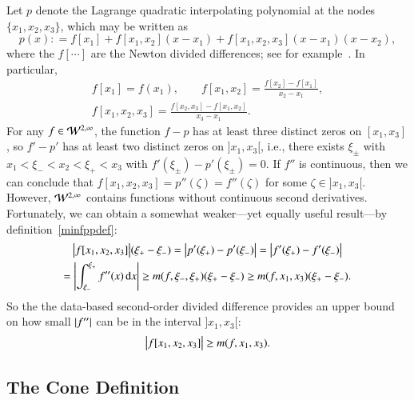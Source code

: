 \documentclass[review]{elsarticle}
\theoremstyle{definition}
\begin{document}
Let $p$ denote the Lagrange quadratic interpolating polynomial at the nodes
$\{x_1, x_2, x_3\}$, which may be written as
\begin{equation*}
p(x) : = f[x_1] + f[x_1, x_2](x-x_1) + f[x_1, x_2, x_3](x-x_1)(x-x_2),
\end{equation*}
where the $f[\cdots]$ are the Newton divided differences; see for example~\cite{CheKin12a}. In particular,
\begin{gather}
\nonumber
f[x_1] = f(x_1), \qquad f[x_1, x_2] = \frac{f[x_2] - f[x_1]}{x_2-x_1},  \\
f[x_1, x_2,x_3] = \frac{f[x_2,x_3] - f[x_1,x_2]}{x_3-x_1}. \label{divdiff}
\end{gather}
For any $f \in
\mathcal{W}^{2,\infty}$, the function $f - p$ has at least three distinct zeros on
$[x_1, x_3]$, so $f' - p'$ has at least two distinct zeros on $]x_1, x_3[$,
i.e., there exists $\xi_\pm$ with $x_1 < \xi_- < x_2 < \xi_+ < x_3$ with
$f'(\xi_\pm) - p'(\xi_{\pm}) = 0$. If $f''$ is continuous, then we can conclude
that $ f[x_1, x_2, x_3]= p''(\zeta) =f''(\zeta) $ for some $\zeta \in ]x_1,
x_3[$. However, $\mathcal{W}^{2,\infty}$ contains functions without continuous
second derivatives. Fortunately, we can obtain a somewhat weaker---yet equally useful result---by  definition~\eqref{minfppdef}:
\begin{multline*}
\bigl \lvert f[x_1, x_2, x_3] \bigr \rvert(\xi_+  - \xi_-) = \left \lvert p'(\xi_+) - p'(\xi_-) \right \rvert =  \left \lvert f'(\xi_+) - f'(\xi_-) \right \rvert \\
= \left \lvert \int_{\xi_-}^{\xi_+} f''(x) \, {\rm d} x \right \rvert \ge m(f,\xi_-, \xi_+) (\xi_+  - \xi_-)  \ge m(f,x_1, x_3) (\xi_+  - \xi_-) .
\end{multline*}
So the the data-based second-order divided difference provides an upper
bound on how small $\left \lvert f'' \right \rvert$ can be in the interval $]x_1, x_3[$:
\begin{equation} \label{NDDbdm}
\bigl \lvert f[x_1, x_2, x_3] \bigr \rvert \ge m(f,x_1, x_3).
\end{equation}

\subsection{The Cone Definition}  \label{sec:conedef}
\end{document}
